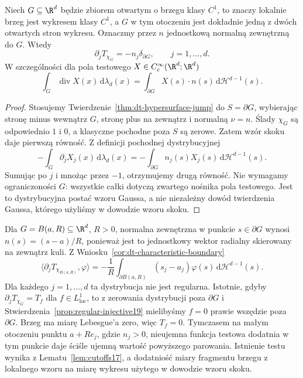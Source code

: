 \begin{wniosek}
\label{cor:dt-characteristic-boundary}
Niech $G\subseteq\R^d$ będzie zbiorem otwartym
o brzegu klasy $C^1$, to znaczy lokalnie brzeg jest
wykresem klasy $C^1$, a $G$ w tym otoczeniu jest
dokładnie jedną z dwóch otwartych stron wykresu.
Oznaczmy przez $n$ jednostkową normalną zewnętrzną do $G$.
Wtedy
\[
 \partial_j T_{\chi_G}=-n_j\delta_{\partial G},
 \qquad j=1,\ldots,d.
\]
W szczególności dla pola testowego
$X\in C_c^\infty(\R^d;\R^d)$
\[
 \int_G \operatorname{div}X(x)\,\mathrm d\lambda_d(x)
 =\int_{\partial G} X(s)\cdot n(s)\,
 \mathrm d\mathcal H^{d-1}(s).
\]
\end{wniosek}
\begin{proof}
Stosujemy Twierdzenie~\ref{thm:dt-hypersurface-jump}
do $S=\partial G$, wybierając stronę minus wewnątrz $G$,
stronę plus na zewnątrz i normalną $\nu=n$.
Ślady $\chi_G$ są odpowiednio $1$ i $0$,
a klasyczne pochodne poza $S$ są zerowe.
Zatem wzór skoku daje pierwszą równość.
Z definicji pochodnej dystrybucyjnej
\[
 -\int_G\partial_j X_j(x)\,\mathrm d\lambda_d(x)
 =-\int_{\partial G}n_j(s)X_j(s)\,
 \mathrm d\mathcal H^{d-1}(s).
\]
Sumując po $j$ i mnożąc przez $-1$, otrzymujemy
drugą równość. Nie wymagamy ograniczoności $G$:
wszystkie całki dotyczą zwartego nośnika pola testowego.
Jest to dystrybucyjna postać wzoru Gaussa,
a nie niezależny dowód twierdzenia Gaussa,
którego użyliśmy w dowodzie wzoru skoku.
\end{proof}

\begin{przyklad}
\label{ex:dt-ball-boundary}
Dla $G=B(a,R)\subseteq\R^d$, $R>0$, normalna
zewnętrzna w punkcie $s\in\partial G$ wynosi
$n(s)=(s-a)/R$, ponieważ jest to jednostkowy
wektor radialny skierowany na zewnątrz kuli.
Z Wniosku~\ref{cor:dt-characteristic-boundary}
\[
 \langle\partial_j T_{\chi_{B(a,R)}},\varphi\rangle
 =-\frac1R\int_{\partial B(a,R)}
 (s_j-a_j)\varphi(s)\,\mathrm d\mathcal H^{d-1}(s).
\]
Dla każdego $j=1,\ldots,d$ ta dystrybucja
nie jest regularna. Istotnie, gdyby
$\partial_jT_{\chi_G}=T_f$ dla
$f\in L^1_{\mathrm{loc}}$, to z zerowania dystrybucji
poza $\partial G$ i Stwierdzenia~\ref{prop:regular-injective19}
mielibyśmy $f=0$ prawie wszędzie poza $\partial G$.
Brzeg ma miarę Lebesgue'a zero, więc $T_f=0$.
Tymczasem na małym otoczeniu punktu $a+Re_j$,
gdzie $n_j>0$, nieujemna funkcja testowa dodatnia
w tym punkcie daje ściśle ujemną wartość powyższego
parowania. Istnienie testu wynika z Lematu~\ref{lem:cutoffs17},
a dodatniość miary fragmentu brzegu z lokalnego wzoru
na miarę wykresu użytego w dowodzie wzoru skoku.
\end{przyklad}

